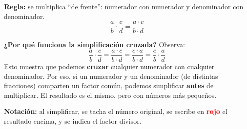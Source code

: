 \documentclass[11pt, letterpaper]{article}
\begin{document}
\begin{tcolorbox}[importantbox, title={Multiplicaci\'on de fracciones}]
\noindent\textbf{Regla:} se multiplica ``de frente'': numerador con numerador y denominador con denominador.
$$\frac{a}{b} \cdot \frac{c}{d} = \frac{a \cdot c}{b \cdot d}$$

\noindent\textbf{¿Por qu\'e funciona la simplificaci\'on cruzada?} Observa:
$$\frac{a}{b} \cdot \frac{c}{d} = \frac{a \cdot c}{b \cdot d} = \frac{c \cdot a}{b \cdot d} = \frac{c}{b} \cdot \frac{a}{d}$$
Esto muestra que podemos \textbf{cruzar} cualquier numerador con cualquier denominador. Por eso, si un numerador y un denominador (de distintas fracciones) comparten un factor com\'un, podemos simplificar \textbf{antes} de multiplicar. El resultado es el mismo, pero con n\'umeros m\'as peque\~nos.

\medskip
\noindent\textbf{Notaci\'on:} al simplificar, se tacha el n\'umero original, se escribe en \textcolor{red}{\textbf{rojo}} el resultado encima, y se indica el factor divisor.
\end{tcolorbox}
\end{document}
